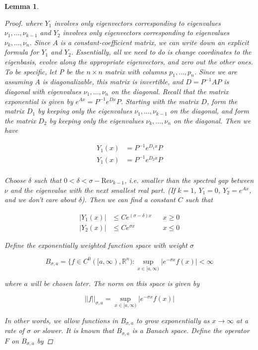 \documentclass[12pt]{article}
\def\R{{\mathbb R}}
\newtheorem{lemma}{Lemma}
\begin{document}
\begin{lemma}
\begin{proof}
where $Y_1$ involves only eigenvectors corresponding to eigenvalues $\nu_1, \dots, \nu_{k-1}$ and $Y_2$ involves only eigenvectors corresponding to eigenvalues $\nu_{k}, \dots, \nu_n$. Since $A$ is a constant-coefficient matrix, we can write down an explicit formula for $Y_1$ and $Y_2$. Essentially, all we need to do is change coordinates to the eigenbasis, evolve along the appropriate eigenvectors, and zero out the other ones. To be specific, let P be the $n \times n$ matrix with columns $p_1, \dots, p_n$. Since we are assuming $A$ is diagonalizable, this matrix is invertible, and $D = P^{-1}AP$ is diagonal with eigenvalues $\nu_1, \dots, \nu_n$ on the diagonal. Recall that the matrix exponential is given by $e^{Ax} = P^{-1}e^{Dx}P$. Starting with the matrix $D$, form the matrix $D_1$ by keeping only the eigenvalues $\nu_1, \dots, \nu_{k-1}$ on the diagonal, and form the matrix $D_2$ by keeping only the eigenvalues $\nu_{k}, \dots, \nu_n$ on the diagonal. Then we have

\begin{align*}
Y_1(x) &= P^{-1}e^{D_1x}P \\
Y_1(x) &= P^{-1}e^{D_2x}P \\
\end{align*}
 
Choose $\delta$ such that $0 < \delta < \sigma - \text{Re} \nu_{k-1}$, i.e. smaller than the spectral gap between $\nu$ and the eigenvalue with the next smallest real part. (If $k = 1$, $Y_1 = 0$, $Y_2 = e^{Ax}$, and we don't care about $\delta$). Then we can find a constant $C$ such that

\begin{align*} 
|Y_1(x)| &\leq Ce^{(\sigma - \delta)x} && x \geq 0 \\
|Y_2(x)| &\leq Ce^{\sigma x} && x \leq 0 
\end{align*}

Define the exponentially weighted function space with weight $\sigma$

\[
B_{\sigma, a} = \{ f \in C^0([a, \infty), \R^n) : \sup_{x \in [a, \infty)} |e^{-\sigma x} f(x)| < \infty 
\]

where $a$ will be chosen later. The norm on this space is given by

\[
||f||_{\sigma, a} = \sup_{x \in [a, \infty)} |e^{-\sigma x} f(x)|
\]

In other words, we allow functions in $B_{\sigma, a}$ to grow exponentially as $x \rightarrow \infty$ at a rate of $\sigma$ or slower. It is known that $B_{\sigma, a}$ is a Banach space. Define the operator $F$ on $B_{\sigma, a}$ by


\end{proof}
\end{lemma}
\end{document}

